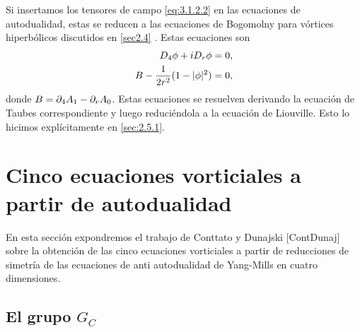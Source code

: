 Si insertamos los tensores de campo \eqref{eq:3.1.2.2} en las ecuaciones de autodualidad, estas se reducen a las ecuaciones de Bogomolny para vórtices hiperbólicos discutidos en \ref{sec2.4} . Estas ecuaciones son
\begin{align}
	\begin{split}
	D_4\phi+iD_r\phi &=0,\\
	B-\frac{1}{2r^2}(1-|\phi|^2) &=0,
	\end{split}
\end{align}
donde $B=\partial_4 A_1-\partial_r A_0$. Estas ecuaciones se resuelven derivando la ecuación de Taubes correspondiente y luego reduciéndola a la ecuación de Liouville. Esto lo hicimos explícitamente en \ref{sec:2.5.1}.


\section{Cinco ecuaciones vorticiales a partir de autodualidad}

En esta sección expondremos el trabajo de Conttato y Dunajski [ContDunaj] sobre la obtención de las cinco ecuaciones vorticiales a partir de reducciones de simetría de las ecuaciones de anti autodualidad de Yang-Mills en cuatro dimensiones.

\subsection{El grupo $G_C$}\label{sec:4.1}

